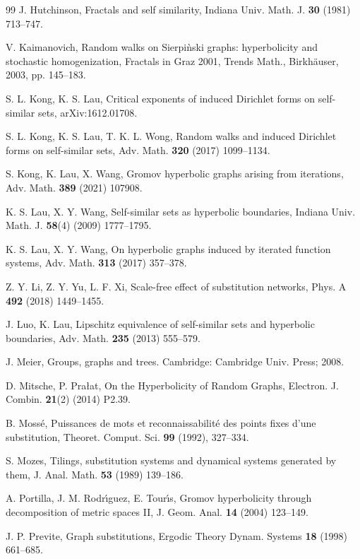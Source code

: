 \documentclass[reqno]{amsart}
\theoremstyle{plain}
\numberwithin{equation}{section}
\begin{document}
\begin{thebibliography}{99}
 J. Hutchinson, Fractals and self similarity, Indiana
Univ. Math. J. \textbf{30} (1981) 713--747.

 V. Kaimanovich, Random walks on Sierpi\`{n}ski graphs:
hyperbolicity and stochastic homogenization, Fractals in Graz 2001, Trends
Math., Birkh\"{a}user, 2003, pp. 145--183.

 S. L. Kong, K. S. Lau, Critical exponents of induced
Dirichlet forms on self-similar sets, arXiv:1612.01708.

 S. L. Kong, K. S. Lau, T. K. L. Wong, Random walks and
induced Dirichlet forms on self-similar sets, Adv. Math. \textbf{320} (2017)
1099--1134.

 S. Kong, K. Lau, X. Wang, Gromov hyperbolic graphs
arising from iterations, Adv. Math. \textbf{389} (2021) 107908.

 K. S. Lau, X. Y. Wang, Self-similar sets as hyperbolic
boundaries, Indiana Univ. Math. J. \textbf{58}(4) (2009) 1777--1795.

 K. S. Lau, X. Y. Wang, On hyperbolic graphs induced by
iterated function systems, Adv. Math. \textbf{313} (2017) 357--378.

 Z. Y. Li, Z. Y. Yu, L. F. Xi, Scale-free effect of substitution
networks, Phys. A \textbf{492} (2018) 1449--1455.

 J. Luo, K. Lau, Lipschitz equivalence of self-similar sets and
hyperbolic boundaries, Adv. Math. \textbf{235} (2013) 555--579.

 J. Meier, Groups, graphs and trees. Cambridge: Cambridge
Univ. Press; 2008.

 D. Mitsche, P. Pra\l at, On the Hyperbolicity of Random
Graphs, Electron. J. Combin. \textbf{21}(2) (2014) P2.39.

 B. Moss\'{e}, Puissances de mots et reconnaissabilit\'{e}
des points fixes d'une substitution, Theoret. Comput. Sci. \textbf{99}
(1992), 327--334.

 S. Mozes, Tilings, substitution systems and dynamical
systems generated by them, J. Anal. Math. \textbf{53} (1989) 139--186.

 A. Portilla, J. M. Rodr\'{\i}guez, E. Tour\'{\i}s, Gromov
hyperbolicity through decomposition of metric spaces II, J. Geom. Anal. 
\textbf{14} (2004) 123--149.

 J. P. Previte, Graph substitutions, Ergodic Theory Dynam.
Systems \textbf{18} (1998) 661--685.


\end{thebibliography}
\end{document}
